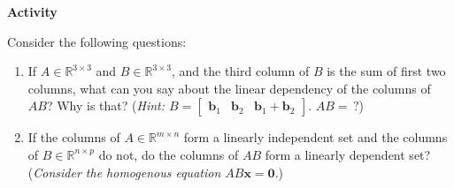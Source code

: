 \documentclass[titlepage, a4paper, 10pt]{article}
\renewcommand{\vec}[1]{\mathbf{#1}}
\newcounter{activity}
\newenvironment{newactivity}
{
	\noindent\textbf{Activity \theactivity}
}
{
\stepcounter{activity}
\par
}
\begin{document}
	\begin{newactivity}
		Consider the following questions:
		\begin{enumerate}
			\item If \(A \in \mathbb{R}^{3 \times 3}\) and \(B \in \mathbb{R}^{3 \times 3}\), and the third column of \(B\) is the sum of first two columns,
				what can you say about the linear dependency of the columns of \(AB\)? Why is that? (\textit{Hint: \(B = \begin{bmatrix}\vec{b}_1 & \vec{b}_2 & \vec{b}_1 + \vec{b}_2\end{bmatrix}\)}. \(AB = \, ?\))
			\item If the columns of \(A \in \mathbb{R}^{m \times n}\) form a linearly independent set and the columns of \(B \in \mathbb{R}^{n \times p}					\) do not, do the columns of \(AB\) form a linearly dependent set? (\textit{Consider the homogenous equation \(AB\vec{x} = \vec{0}\)}.)
		\end{enumerate}
	\end{newactivity}
\end{document}
